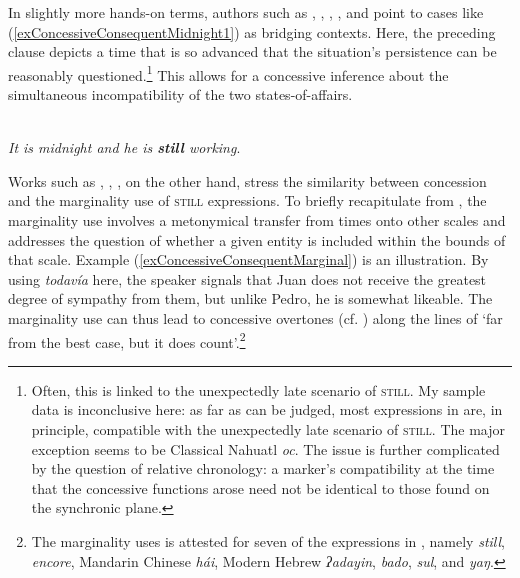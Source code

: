 In slightly more hands-on terms, authors such as \textcite{Deloor2012}, \textcite{EderlyCurco2016}, \textcite{KoenigTraugott1982}, \textcite{Lewis2019}, and \textcite{PerezSaldanyaSalvador1995} point to cases like (\ref{exConcessiveConsequentMidnight1}) as bridging contexts. Here, the preceding clause depicts a time that is so advanced that the situation's persistence can be reasonably questioned.\footnote{Often, this is linked to the unexpectedly late scenario of \textsc{still}. My sample data is inconclusive here: as far as can be judged, most expressions in  are, in principle, compatible with the unexpectedly late scenario of \textsc{still}. The major exception seems to be Classical Nahuatl \textit{oc}. The issue is further complicated by the question of relative chronology: a marker's compatibility at the time that the concessive functions arose need not be identical to those found on the synchronic plane.} This allows for a concessive inference about the simultaneous incompatibility of the two states-of-affairs.

\begin{exe}
	\ex {}\\
	\textit{It is midnight and he is \textbf{still} working}.\label{exConcessiveConsequentMidnight1} \parencite[276]{Koenig1985}
\end{exe}

Works such as \textcite{Ippolito2004}, \textcite{Koenig1977}, \textcite{Michaelis1993}, on the other hand, stress the similarity between concession and the marginality use of \textsc{still} expressions. To briefly recapitulate from , the marginality use involves a metonymical transfer from times onto other scales and addresses the question of whether a given entity is included within the bounds of that scale. Example (\ref{exConcessiveConsequentMarginal}) is an illustration. By using \textit{todavía} here, the speaker signals that Juan does not receive the greatest degree of sympathy from them, but unlike Pedro, he is somewhat likeable. The marginality use can thus lead to concessive overtones  (cf. \cite[174–175]{MosegaardHansen2008}) along the lines of \lq far from the best case, but it does count\rq{}.\footnote{The marginality uses is attested for seven of the expressions in , namely  \textit{still},  \textit{encore}, Mandarin Chinese \textit{hái}, Modern Hebrew \textit{ʔadayin},  \textit{bado},  \textit{sul}, and  \textit{yaŋ}.}

